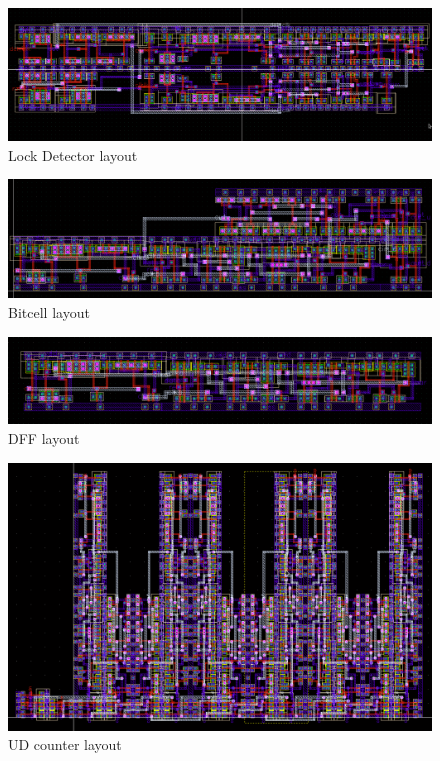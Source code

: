 \documentclass[a4paper,12pt]{article} \usepackage{graphicx}
\begin{document}
\begin{figure}[h]
  \centering
  \includegraphics[width=1.0\textwidth]{../Bilder/Layout/lock_detector.png}
  \caption{Lock Detector layout}
  \label{fig:LD}
\end{figure}

\begin{figure}[h]
  \centering
  \includegraphics[width=1.0\textwidth]{../Bilder/Layout/bitcell.png}
  \caption{Bitcell layout}
  \label{fig:bitcell_final}
\end{figure}

\begin{figure}[h]
  \centering
  \includegraphics[width=1.0\textwidth]{../Bilder/Layout/dff_sync_reset_qbar_clkset.png}
  \caption{DFF layout}
  \label{fig:dff_final}
\end{figure}

\begin{figure}[h]
  \centering
  \includegraphics[width=1.0\textwidth]{../Bilder/Layout/ud_counter_6bit.png}
  \caption{UD counter layout}
  \label{fig:counter_final}
\end{figure}
\end{document}
